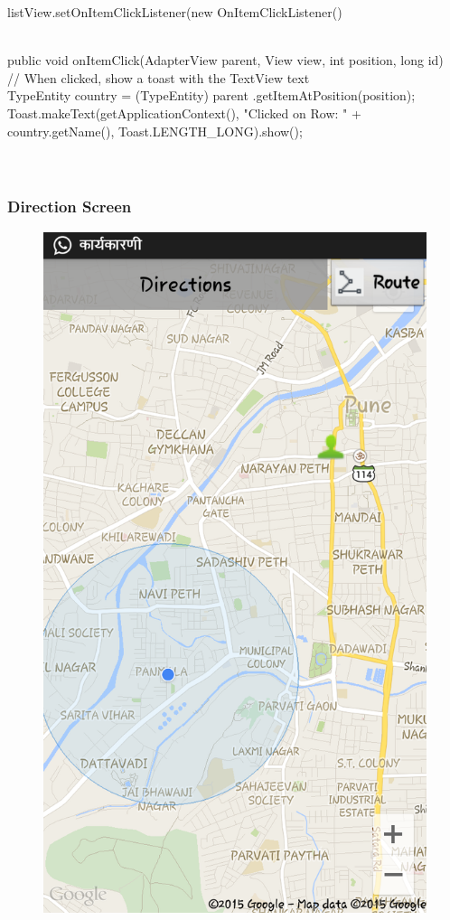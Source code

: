 \documentclass[12pt,a4paper]{article}
\begin{document}
	listView.setOnItemClickListener(new OnItemClickListener() {\\
			public void onItemClick(AdapterView parent, View view,
					int position, long id) {\\
				// When clicked, show a toast with the TextView text\\
				TypeEntity country = (TypeEntity) parent
						.getItemAtPosition(position);\\
				Toast.makeText(getApplicationContext(),
						"Clicked on Row: " + country.getName(),
						Toast.LENGTH_LONG).show();\\
			}\\
			
\newpage
\\
\subsubsection{Direction Screen}
\begin{figure}[!htb]
\centering
\includegraphics[width=12 cm]{directions}

\end{figure}}
\end{document}
